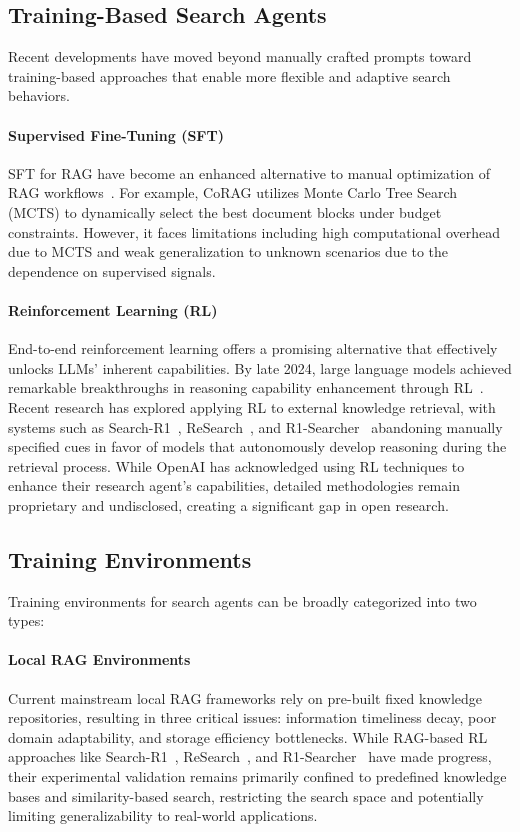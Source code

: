 \documentclass{article}
\begin{document}
\subsection{Training-Based Search Agents}
Recent developments have moved beyond manually crafted prompts toward training-based approaches that enable more flexible and adaptive search behaviors.

\paragraph{Supervised Fine-Tuning (SFT)}
SFT for RAG have become an enhanced alternative to manual optimization of RAG workflows~\cite{yu2024auto, wang2024corag}. For example, CoRAG \cite{wang2024corag} utilizes Monte Carlo Tree Search (MCTS) to dynamically select the best document blocks under budget constraints. However, it faces limitations including high computational overhead due to MCTS and weak generalization to unknown scenarios due to the dependence on supervised signals.

\paragraph{Reinforcement Learning (RL)}
End-to-end reinforcement learning offers a promising alternative that effectively unlocks LLMs' inherent capabilities. By late 2024, large language models achieved remarkable breakthroughs in reasoning capability enhancement through RL~\cite{guo2025deepseek, openai-o1, team2025kimi}. Recent research has explored applying RL to external knowledge retrieval, with systems such as Search-R1~\cite{jin2025search}, ReSearch~\cite{chen2025research}, and R1-Searcher~\cite{song2025r1} abandoning manually specified cues in favor of models that autonomously develop reasoning during the retrieval process. While OpenAI has acknowledged using RL techniques to enhance their research agent's capabilities, detailed methodologies remain proprietary and undisclosed, creating a significant gap in open research.

\subsection{Training Environments}
Training environments for search agents can be broadly categorized into two types:

\paragraph{Local RAG Environments}
Current mainstream local RAG frameworks \cite{gao2023retrieval, yu2024auto} rely on pre-built fixed knowledge repositories, resulting in three critical issues: information timeliness decay, poor domain adaptability, and storage efficiency bottlenecks. While RAG-based RL approaches like Search-R1~\cite{jin2025search}, ReSearch~\cite{chen2025research}, and R1-Searcher~\cite{song2025r1} have made progress, their experimental validation remains primarily confined to predefined knowledge bases and similarity-based search, restricting the search space and potentially limiting generalizability to real-world applications.
\end{document}
